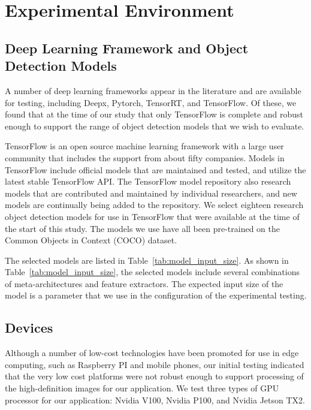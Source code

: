 \documentclass[conference]{IEEEtran}
\begin{document}
\section{Experimental Environment}

\subsection{Deep Learning Framework and Object Detection Models}
A number of deep learning frameworks appear in the literature and are available for testing, including Deepx, Pytorch, TensorRT, and TensorFlow.  
Of these, we found that at the time of our study that only TensorFlow is complete and robust enough to support the range of object detection models that we wish to evaluate.  

TensorFlow is an open source machine learning framework with a large user community that includes the support from about fifty companies.
Models in TensorFlow include official models that are maintained and tested, and utilize the latest stable TensorFlow API.  The TensorFlow model repository also research models that are contributed and maintained by individual researchers, and new models are continually being added to the repository.  We select eighteen research object detection models for use in TensorFlow that were available at the time of the start of this study.
The models we use have all been pre-trained on the Common Objects in Context (COCO) dataset.

The selected models are listed in Table~\ref{tab:model_input_size}.
As shown in Table~\ref{tab:model_input_size}, the selected models include several combinations of meta-architectures and feature extractors.  
The expected input size of the model is a parameter that we use in the configuration of the experimental testing.

\subsection{Devices}
Although a number of low-cost technologies have been promoted for use in edge computing, such as Raspberry PI and mobile phones, our initial testing indicated that the very low cost platforms were not robust enough to support processing of the high-definition images for our application.  
We test three types of GPU processor for our application: Nvidia V100, Nvidia P100, and Nvidia Jetson TX2.
\end{document}
